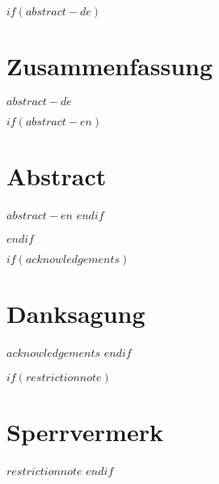 
$if(abstract-de)$
\cleardoublepage
\begin{minipage}{\linewidth}

\chapter*{Zusammenfassung}
$abstract-de$

$if(abstract-en)$
\chapter*{Abstract}
$abstract-en$
$endif$

\end{minipage}
\cleardoublepage
$endif$



$if(acknowledgements)$
\chapter*{Danksagung}
$acknowledgements$
$endif$



$if(restrictionnote)$
\chapter*{Sperrvermerk}
$restrictionnote$
$endif$



\cleardoublepage
